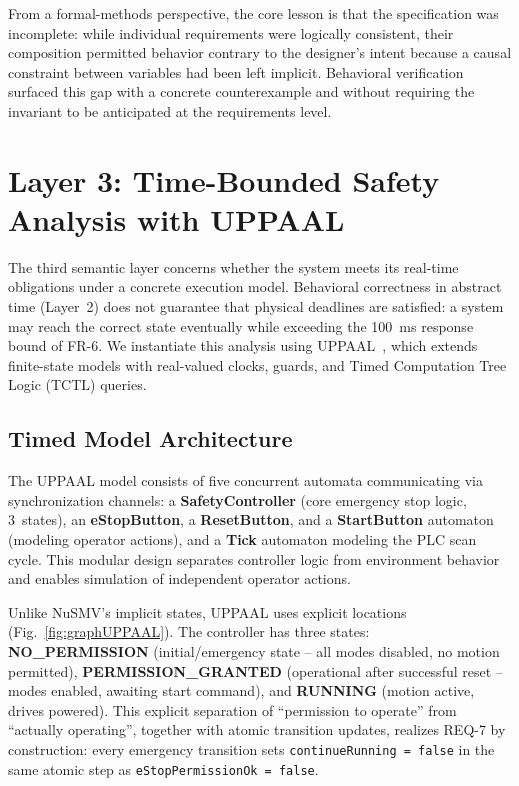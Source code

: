 \documentclass{ieeeaccess}
\theoremstyle{definition}
\begin{document}
From a formal-methods perspective, the core lesson is that the specification was incomplete: while individual requirements were logically consistent, their composition permitted behavior contrary to the designer's intent because a causal constraint between variables had been left implicit. Behavioral verification surfaced this gap with a concrete counterexample and without requiring the invariant to be anticipated at the requirements level.

\section{Layer 3: Time-Bounded Safety Analysis with UPPAAL}
\label{sec:uppaal}
The third semantic layer concerns whether the system meets its real-time obligations under a concrete execution model. Behavioral correctness in abstract time (Layer~2) does not guarantee that physical deadlines are satisfied: a system may reach the correct state eventually while exceeding the 100~ms response bound of FR-6. We instantiate this analysis using UPPAAL~\cite{Behrmann2006UPPAAL}, which extends finite-state models with real-valued clocks, guards, and Timed Computation Tree Logic (TCTL) queries.

\subsection{Timed Model Architecture}
The UPPAAL model consists of five concurrent automata communicating via synchronization channels: a \textbf{SafetyController} (core emergency stop logic, 3~states), an \textbf{eStopButton}, a \textbf{ResetButton}, and a \textbf{StartButton} automaton (modeling operator actions), and a \textbf{Tick} automaton modeling the PLC scan cycle. This modular design separates controller logic from environment behavior and enables simulation of independent operator actions.

Unlike NuSMV's implicit states, UPPAAL uses explicit locations (Fig.~\ref{fig:graphUPPAAL}). The controller has three states: \textbf{NO\_PERMISSION} (initial/emergency state -- all modes disabled, no motion permitted), \textbf{PERMISSION\_GRANTED} (operational after successful reset -- modes enabled, awaiting start command), and \textbf{RUNNING} (motion active, drives powered). This explicit separation of ``permission to operate'' from ``actually operating'', together with atomic transition updates, realizes REQ-7 by construction: every emergency transition sets \texttt{continueRunning = false} in the same atomic step as \texttt{eStopPermissionOk = false}.
\end{document}
